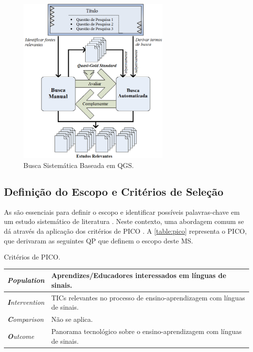 \begin{figure}[htb]
\centering 
\caption{Busca Sistemática Baseada em QGS.}
\label{ms:zhang-approach}
\includegraphics[width=0.675\textwidth]{images/chapter2-sm-zhang-approach.png}
\end{figure}

\subsection{Definição do Escopo e Critérios de Seleção}
\label{ms:conducao-escopo}

As  são essenciais para definir o escopo e identificar possíveis palavras-chave em um estudo sistemático de literatura \cite{Kitchenham2007,Petersen2015}. Neste contexto, uma abordagem comum se dá através da aplicação dos critérios de PICO \cite{Petticrew2008}. A \autoref{table:pico} representa o PICO, que derivaram as seguintes QP que definem o escopo deste MS.

\begin{quadro}[htb]
\centering
\caption{Critérios de PICO.}
\label{table:pico}
\begin{tabularx}{\textwidth}{l|X} \hline
\textit{\textbf{P}opulation} & Aprendizes/Educadores interessados em línguas de sinais. \\ \hline
\textit{\textbf{I}ntervention} & TICs relevantes no processo de ensino-aprendizagem com línguas de sinais. \\ \hline
\textit{\textbf{C}omparison} & Não se aplica. \\ \hline
\textit{\textbf{O}utcome} & Panorama tecnológico sobre o ensino-aprendizagem com línguas de sinais. \\ \hline
\end{tabularx}
\end{quadro}

